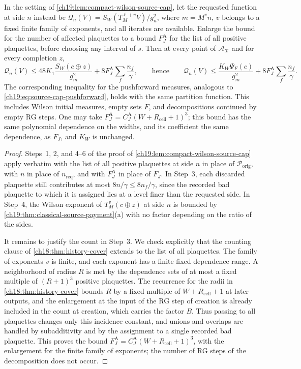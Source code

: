 \begin{corollary}\label{ch19:lem:all-face-source-cap}
In the setting of \cref{ch19:lem:compact-wilson-source-cap}, let the requested function at side $n$ instead be $\mathcal Q_n(V)=S_W(T_M^{\ell+v}V)/g_n^2$, where $m=M^vn$, $v$ belongs to a fixed finite family of exponents, and all iterates are available. Enlarge the bound for the number of affected plaquettes to a bound $F_J^{\mathrm A}$ for the list of all positive plaquettes, before choosing any interval of $s$. Then at every point of $\mathcal A_{\mathcal X}$ and for every completion $z$,
\[
 \mathcal Q_n(V)\le48K_1\frac{S_W(c\oplus z)}{g_m^2}+8F_J^{\mathrm A}\sum_f\frac{n_f}\gamma,
 \qquad\text{hence}\qquad
 \mathcal Q_n(V)\le\frac{K_W\Psi_F(c)}{g_m^2}+8F_J^{\mathrm A}\sum_f\frac{n_f}\gamma.
\]
The corresponding inequality for the pushforward measures, analogous to \eqref{ch19:eq:source-cap-pushforward}, holds with the same partition function. This includes Wilson initial measures, empty sets $F$, and decompositions continued by empty RG steps. One may take $F_J^{\mathrm A}=C_J^{\mathrm A}(W+R_{\mathrm{cell}}+1)^3$; this bound has the same polynomial dependence on the widths, and its coefficient the same dependence, as $F_J$, and $K_W$ is unchanged.
\end{corollary}

\begin{proof}
Steps~1, 2, and 4--6 of the proof of \cref{ch19:lem:compact-wilson-source-cap} apply verbatim with the list of all positive plaquettes at side $n$ in place of $\mathcal P_{\mathrm{orig}}$, with $n$ in place of $n_{\mathrm{req}}$, and with $F_J^{\mathrm A}$ in place of $F_J$. In Step~3, each discarded plaquette still contributes at most $8n/\gamma\le8n_f/\gamma$, since the recorded bad plaquette to which it is assigned lies at a level finer than the requested side. In Step~4, the Wilson exponent of $T_M^v(c\oplus z)$ at side $n$ is bounded by \cref{ch19:thm:classical-source-payment}(a) with no factor depending on the ratio of the sides.

It remains to justify the count in Step~3. We check explicitly that the counting clause of \cref{ch18:thm:history-cover} extends to the list of all plaquettes. The family of exponents $v$ is finite, and each exponent has a finite fixed dependence range. A neighborhood of radius $R$ is met by the dependence sets of at most a fixed multiple of $(R+1)^3$ positive plaquettes. The recurrence for the radii in \cref{ch18:thm:history-cover} bounds $R$ by a fixed multiple of $W+R_{\mathrm{cell}}+1$ at later outputs, and the enlargement at the input of the RG step of creation is already included in the count at creation, which carries the factor $B$. Thus passing to all plaquettes changes only this incidence constant, and unions and overlaps are handled by subadditivity and by the assignment to a single recorded bad plaquette. This proves the bound $F_J^{\mathrm A}=C_J^{\mathrm A}(W+R_{\mathrm{cell}}+1)^3$, with the enlargement for the finite family of exponents; the number of RG steps of the decomposition does not occur.
\end{proof}

